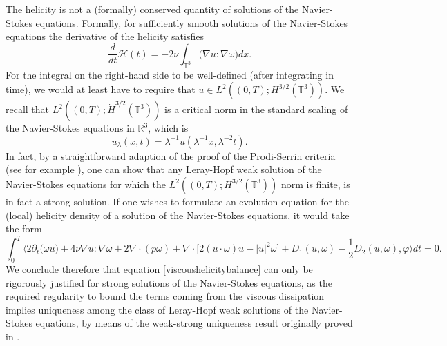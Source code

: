 \documentclass[12pt,a4paper]{article}
\theoremstyle{definition}
\theoremstyle{remark}
\numberwithin{equation}{section}
\begin{document}
The helicity is not a (formally) conserved quantity of solutions of the Navier-Stokes equations. Formally, for sufficiently smooth solutions of the Navier-Stokes equations the derivative of the helicity satisfies
\begin{equation}
\frac{d}{dt} \mathcal{H} (t) = - 2 \nu \int_{\mathbb{T}^3} \bigg( \nabla u : \nabla \omega \bigg) dx. 
\end{equation}
For the integral on the right-hand side to be well-defined (after integrating in time), we would at least have to require that $u \in L^2 ((0,T); H^{3/2} (\mathbb{T}^3))$. We recall that $L^2 ((0,T); \dot{H}^{3/2} (\mathbb{T}^3))$ is a critical norm in the standard scaling of the Navier-Stokes equations in $\mathbb{R}^3$, which is
\begin{equation}
u_\lambda (x,t) = \lambda^{-1} u (\lambda^{-1} x, \lambda^{-2} t). 
\end{equation}
In fact, by a straightforward adaption of the proof of the Prodi-Serrin criteria (see for example \cite{bedrossianbook}), one can show that any Leray-Hopf weak solution of the Navier-Stokes equations for which the $L^2 ((0,T); H^{3/2} (\mathbb{T}^3))$ norm is finite, is in fact a strong solution. If one wishes to formulate an evolution equation for the (local) helicity density of a solution of the Navier-Stokes equations, it would take the form
\begin{equation} \label{viscoushelicitybalance}
\int_0^T \bigg\langle 2 \partial_t \big( \omega u \big) + 4 \nu \nabla u : \nabla \omega + 2 \nabla \cdot (p \omega) + \nabla \cdot \big[ 2 (u \cdot \omega) u - \lvert u \rvert^2 \omega \big] + D_1 (u,\omega) - \frac{1}{2} D_2 (u, \omega), \varphi \bigg\rangle dt = 0.
\end{equation}
We conclude therefore that equation \eqref{viscoushelicitybalance} can only be rigorously justified for strong solutions of the Navier-Stokes equations, as the required regularity to bound the terms coming from the viscous dissipation implies uniqueness among the class of Leray-Hopf weak solutions of the Navier-Stokes equations, by means of the weak-strong uniqueness result originally proved in \cite{serrin}. 
\end{document}
